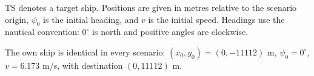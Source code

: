 \begin{table}[t]
\begin{threeparttable}
\begin{tablenotes}[flushleft]
\footnotesize
\item TS denotes a target ship. Positions are given in metres relative
to the scenario origin, $\psi_0$ is the initial heading, and $v$ is
the initial speed. Headings use the nautical convention: $0^\circ$ is
north and positive angles are clockwise.
\item The own ship is identical in every scenario:
$(x_0,y_0)=(0,-11112)$ m, $\psi_0=0^\circ$, $v=6.173$ m/s,
with destination $(0,11112)$ m.
\end{tablenotes}

\end{threeparttable}
\end{table}

\begin{table}[t]
\centering
\caption{Initial vessel configurations for IMAZU Scenarios 12--22.}
\label{tab:imazu-scenarios-2}
\begin{threeparttable}


\end{threeparttable}
\end{table}
